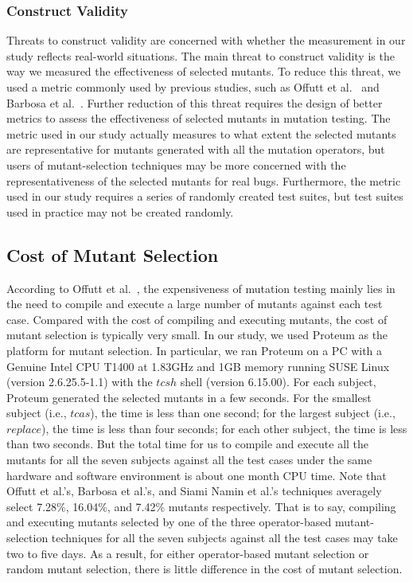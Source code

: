 \vspace{-1.5ex}
\subsubsection{Construct Validity}
\label{Construct}

Threats to construct validity are concerned with whether the
measurement in our study reflects real-world situations. The main
threat to construct validity is the way we measured the
effectiveness of selected mutants. To reduce this threat, we used
a metric commonly used by previous studies, such as Offutt et
al.~\cite{Offutt:96} and Barbosa et al.~\cite{Barbosa:01}. Further
reduction of this threat requires the design of better metrics to
assess the effectiveness of selected mutants in mutation testing.
The metric used in our study actually measures to what extent the
selected mutants are representative for mutants generated with all
the mutation operators, but users of mutant-selection techniques
may be more concerned with the representativeness of the selected
mutants for real bugs. Furthermore, the metric used in our study
requires a series of randomly created test suites, but test suites
used in practice may not be created randomly.

\vspace{-1.5ex}
\subsection{Cost of Mutant Selection}
\label{Cost}

According to Offutt et al.~\cite{Offutt:96}, the expensiveness of
mutation testing mainly lies in the need to compile and execute a
large number of mutants against each test case. Compared with the
cost of compiling and executing mutants, the cost of mutant
selection is typically very small. In our study, we used Proteum
as the platform for mutant selection. In particular, we ran
Proteum on a PC with a Genuine Intel CPU T1400 at 1.83GHz and 1GB
memory running SUSE Linux (version 2.6.25.5-1.1) with the $tcsh$
shell (version 6.15.00). For each subject, Proteum generated the
selected mutants in a few seconds. For the smallest subject (i.e.,
$tcas$), the time is less than one second; for the largest subject
(i.e., $replace$), the time is less than four seconds; for each
other subject, the time is less than two seconds. But the total
time for us to compile and execute all the mutants for all the
seven subjects against all the test cases under the same hardware
and software environment is about one month CPU time. Note that
Offutt et al.'s, Barbosa et al.'s, and Siami Namin et al.'s
techniques averagely select 7.28\%, 16.04\%, and 7.42\% mutants
respectively. That is to say, compiling and executing mutants
selected by one of the three operator-based mutant-selection
techniques for all the seven subjects against all the test cases
may take two to five days. As a result, for either operator-based
mutant selection or random mutant selection, there is little
difference in the cost of mutant selection.

